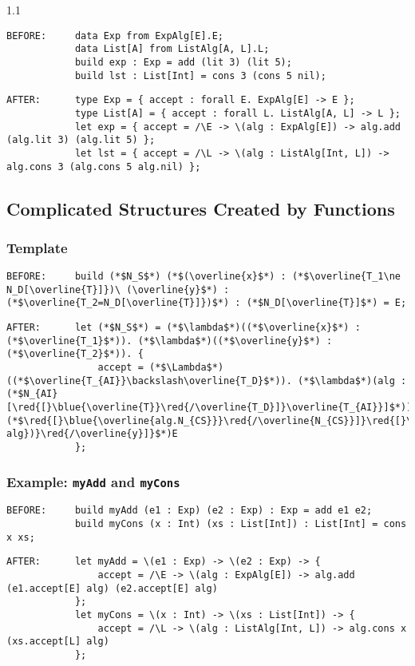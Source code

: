 \documentclass{article}
\newcommand{\red}[1]{\textcolor{red}{#1}}
\newcommand{\blue}[1]{\textcolor{blue}{#1}}
\begin{document}
\begin{spacing}{1.1}
\begin{lstlisting}[numbers=none]
BEFORE:     data Exp from ExpAlg[E].E;
            data List[A] from ListAlg[A, L].L;
            build exp : Exp = add (lit 3) (lit 5);
            build lst : List[Int] = cons 3 (cons 5 nil);
\end{lstlisting}
\begin{lstlisting}[numbers=none]
AFTER:      type Exp = { accept : forall E. ExpAlg[E] -> E };
            type List[A] = { accept : forall L. ListAlg[A, L] -> L };
            let exp = { accept = /\E -> \(alg : ExpAlg[E]) -> alg.add (alg.lit 3) (alg.lit 5) };
            let lst = { accept = /\L -> \(alg : ListAlg[Int, L]) -> alg.cons 3 (alg.cons 5 alg.nil) };
\end{lstlisting}

\subsection{Complicated Structures Created by Functions}

\subsubsection{Template}

\begin{lstlisting}[numbers=none]
BEFORE:     build (*$N_S$*) (*$(\overline{x}$*) : (*$\overline{T_1\ne N_D[\overline{T}]})\ (\overline{y}$*) : (*$\overline{T_2=N_D[\overline{T}]})$*) : (*$N_D[\overline{T}]$*) = E;
\end{lstlisting}
\begin{lstlisting}[numbers=none]
AFTER:      let (*$N_S$*) = (*$\lambda$*)((*$\overline{x}$*) : (*$\overline{T_1}$*)). (*$\lambda$*)((*$\overline{y}$*) : (*$\overline{T_2}$*)). {
                accept = (*$\Lambda$*)((*$\overline{T_{AI}}\backslash\overline{T_D}$*)). (*$\lambda$*)(alg : (*$N_{AI}[\red{[}\blue{\overline{T}}\red{/\overline{T_D}]}\overline{T_{AI}}]$*)). (*$\red{[}\blue{\overline{alg.N_{CS}}}\red{/\overline{N_{CS}}]}\red{[}\blue{(\overline{y.accept[\overline{T_{AI}}\backslash\overline{T_D}]\ alg})}\red{/\overline{y}]}$*)E
            };
\end{lstlisting}

\subsubsection{Example: \lstinline{myAdd} and \lstinline{myCons}}

\begin{lstlisting}[numbers=none]
BEFORE:     build myAdd (e1 : Exp) (e2 : Exp) : Exp = add e1 e2;
            build myCons (x : Int) (xs : List[Int]) : List[Int] = cons x xs;
\end{lstlisting}
\begin{lstlisting}[numbers=none]
AFTER:      let myAdd = \(e1 : Exp) -> \(e2 : Exp) -> {
                accept = /\E -> \(alg : ExpAlg[E]) -> alg.add (e1.accept[E] alg) (e2.accept[E] alg)
            };
            let myCons = \(x : Int) -> \(xs : List[Int]) -> {
                accept = /\L -> \(alg : ListAlg[Int, L]) -> alg.cons x (xs.accept[L] alg)
            };
\end{lstlisting}


\end{spacing}
\end{document}
